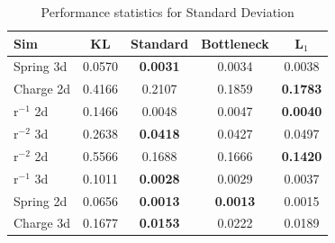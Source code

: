 \documentclass[11pt]{article}
\begin{document}
        \begin{table}[h]
            \centering
            \begin{tabular}{lcccc}
            \hline
            Sim & KL & Standard & Bottleneck & L$_{1}$ \\
            \hline
            Spring 3d & 0.0570 & \textbf{0.0031} & 0.0034 & 0.0038 \\
            Charge 2d & 0.4166 & 0.2107 & 0.1859 & \textbf{0.1783} \\
            r$^{-1}$ 2d & 0.1466 & 0.0048 & 0.0047 & \textbf{0.0040} \\
            r$^{-2}$ 3d & 0.2638 & \textbf{0.0418} & 0.0427 & 0.0497 \\
            r$^{-2}$ 2d & 0.5566 & 0.1688 & 0.1666 & \textbf{0.1420} \\
            r$^{-1}$ 3d & 0.1011 & \textbf{0.0028} & 0.0029 & 0.0037 \\
            Spring 2d & 0.0656 & \textbf{0.0013} & \textbf{0.0013} & 0.0015 \\
            Charge 3d & 0.1677 & \textbf{0.0153} & 0.0222 & 0.0189 \\
            \hline
            \end{tabular}
            \caption{Performance statistics for Standard Deviation}
            \label{tab:Standard Deviation}
            \end{table}
  
\end{document}
